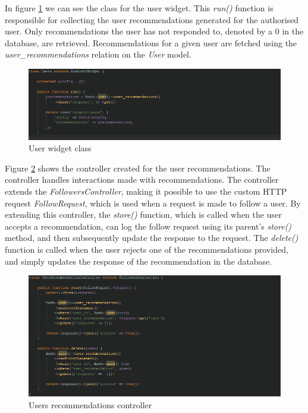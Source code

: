 In figure \ref{fig:UsersWidget} we can see the class for the user widget. This \textit{run()} function is responsible for collecting the user recommendations generated for the authorised user. Only recommendations the user has not responded to, denoted by a 0 in the database, are retrieved. Recommendations for a given user are fetched using the \textit{user\_recommendations} relation on the \emph{User} model.

\begin{figure}[H]
\centering
\includegraphics[width=1\textwidth]{Images/Implementation/UsersWidget}
\caption{User widget class}
\label{fig:UsersWidget}
\end{figure}

Figure \ref{fig:UserRecommendationsController} shows the controller created for the user recommendations. The controller handles interactions made with recommendations. The controller extends the \textit{FollowersController}, making it possible to use the custom HTTP request \textit{FollowRequest}, which is used when a request is made to follow a user. By extending this controller, the \textit{store()} function, which is called when the user accepts a recommendation, can log the follow request using its parent's \textit{store()} method, and then subsequently update the response to the request. The \textit{delete()} function is called when the user rejects one of the recommendations provided, and simply updates the response of the recommendation in the database.

\begin{figure}[H]
\centering
\includegraphics[width=1\textwidth]{Images/Implementation/UserRecommendationsController}
\caption{Users recommendations controller}
\label{fig:UserRecommendationsController}
\end{figure}